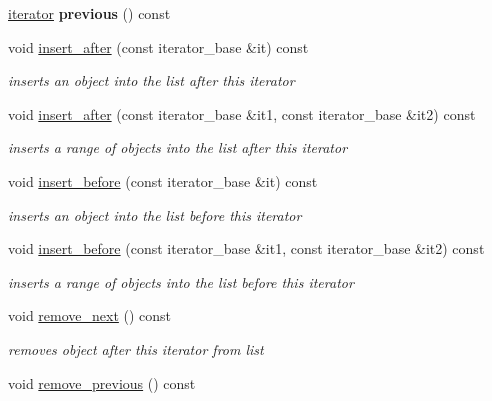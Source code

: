 \begin{DoxyCompactItemize}
\item 
\hypertarget{structIntrusiveList_1_1iterator_a8d1cc575cd72c8ea507f7af1f30b791d}{}\hyperlink{structIntrusiveList_1_1iterator}{iterator} {\bfseries previous} () const \label{structIntrusiveList_1_1iterator_a8d1cc575cd72c8ea507f7af1f30b791d}

\item 
void \hyperlink{structIntrusiveList_1_1iterator_a5ff7644483287f7751267fd5642eb646}{insert\+\_\+after} (const iterator\+\_\+base \&it) const 
\begin{DoxyCompactList}\small\item\em inserts an object into the list after this iterator \end{DoxyCompactList}\item 
void \hyperlink{structIntrusiveList_1_1iterator_a26bd41fd3a9e136d4893620c13c96479}{insert\+\_\+after} (const iterator\+\_\+base \&it1, const iterator\+\_\+base \&it2) const 
\begin{DoxyCompactList}\small\item\em inserts a range of objects into the list after this iterator \end{DoxyCompactList}\item 
void \hyperlink{structIntrusiveList_1_1iterator_ae56c28dede92a6c4e548a333d86667e5}{insert\+\_\+before} (const iterator\+\_\+base \&it) const 
\begin{DoxyCompactList}\small\item\em inserts an object into the list before this iterator \end{DoxyCompactList}\item 
void \hyperlink{structIntrusiveList_1_1iterator_acbcf1f9e9d25eeafc8709aebdf050d20}{insert\+\_\+before} (const iterator\+\_\+base \&it1, const iterator\+\_\+base \&it2) const 
\begin{DoxyCompactList}\small\item\em inserts a range of objects into the list before this iterator \end{DoxyCompactList}\item 
\hypertarget{structIntrusiveList_1_1iterator_ad88631d8c2418869c4e93b2ba2a32452}{}void \hyperlink{structIntrusiveList_1_1iterator_ad88631d8c2418869c4e93b2ba2a32452}{remove\+\_\+next} () const \label{structIntrusiveList_1_1iterator_ad88631d8c2418869c4e93b2ba2a32452}

\begin{DoxyCompactList}\small\item\em removes object after this iterator from list \end{DoxyCompactList}\item 
\hypertarget{structIntrusiveList_1_1iterator_a32c22fe2252a3c8fe35f73f3d24902da}{}void \hyperlink{structIntrusiveList_1_1iterator_a32c22fe2252a3c8fe35f73f3d24902da}{remove\+\_\+previous} () const \label{structIntrusiveList_1_1iterator_a32c22fe2252a3c8fe35f73f3d24902da}


\end{DoxyCompactItemize}
